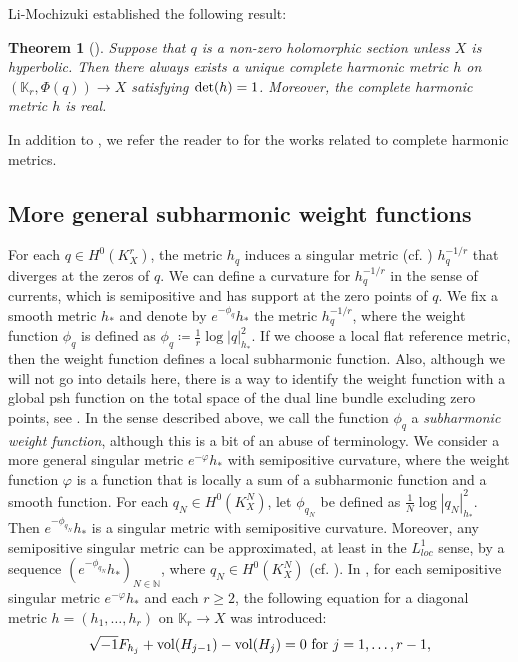 \documentclass[12pt]{article}
\theoremstyle{definition}
\newtheorem{theo}[defi]{Theorem}
\def\det{{\rm det}}
\def\det{{\rm det}}
\def\refe{\ast}
\def\vol{{\rm vol}}
\def\N{{\mathbb N}}
\def\K{{\mathbb K}}
\def\inum{{\sqrt{-1}}}
\begin{document}
Li-Mochizuki \cite{LM1} established the following result:
\begin{theo}[\cite{LM1}]{\it Suppose that $q$ is a non-zero holomorphic section unless $X$ is hyperbolic. Then there always exists a unique complete harmonic metric $h$ on $(\K_r,\Phi(q))\rightarrow X$ satisfying $\det(h)=1$. Moreover, the complete harmonic metric $h$ is real.
}
\end{theo}
In addition to \cite{LM1}, we refer the reader to \cite{DL3, DW1, GL1, LT1, LTW1, Li1, LM2, Moc0, Moc1, Nie1, Wan1, WA1} for the works related to complete harmonic metrics. 

\subsection{More general subharmonic weight functions}\label{2.2}
For each $q\in H^0(K_X^r)$, the metric $h_q$ induces a singular metric (cf. \cite{GZ1}) $h_q^{-1/r}$ that diverges at the zeros of $q$. We can define a curvature for $h_q^{-1/r}$ in the sense of currents, which is semipositive and has support at the zero points of $q$. We fix a smooth metric $h_\refe$ and denote by $e^{-\phi_q}h_\refe$ the metric $h_q^{-1/r}$, where the weight function $\phi_q$ is defined as $\phi_q\coloneqq \frac{1}{r}\log|q|_{h_\refe}^2$. If we choose a local flat reference metric, then the weight function defines a local subharmonic function. Also, although we will not go into details here, there is a way to identify the weight function with a global psh function on the total space of the dual line bundle excluding zero points, see \cite[Section 2.1]{BB1}. In the sense described above, we call the function $\phi_q$ a {\it subharmonic weight function}, although this is a bit of an abuse of terminology. We consider a more general singular metric $e^{-\varphi}h_\refe$ with semipositive curvature, where the weight function $\varphi$ is a function that is locally a sum of a subharmonic function and a smooth function. For each $q_N\in H^0(K_X^N)$, let $\phi_{q_N}$ be defined as $\frac{1}{N}\log|q_N|_{h_\refe}^2$. Then $e^{-\phi_{q_N}}h_\refe$ is a singular metric with semipositive curvature. Moreover, any semipositive singular metric can be approximated, at least in the $L^1_{loc}$ sense, by a sequence $(e^{-\phi_{q_N}}h_\refe)_{N\in\N}$, where $q_N\in H^0(K_X^N)$ (cf. \cite{GZ1}). In \cite{Miy2, Miy3}, for each semipositive singular metric $e^{-\varphi}h_\refe$ and each $r\geq 2$, the following equation for a diagonal metric $h=(h_1,\dots, h_r)$ on $\K_r\rightarrow X$ was introduced:
\begin{align}
\inum F_{h_j} + \vol(H_{j-1}) - \vol(H_j) = 0 \ \text{for $j=1,\dots, r-1$}, \label{phi}
\end{align}
\end{document}
